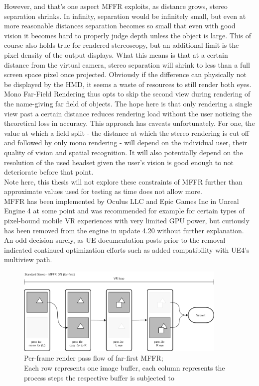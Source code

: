 However, and that's one aspect MFFR exploits, as distance grows, stereo separation shrinks. In infinity, separation would be infinitely small, but even at more reasonable distances separation becomes so small that even with good vision it becomes hard to properly judge depth unless the object is large. This of course also holds true for rendered stereoscopy, but an additional limit is the pixel density of the output displays. What this means is that at a certain distance from the virtual camera, stereo separation will shrink to less than a full screen space pixel once projected. Obviously if the difference can physically not be displayed by the HMD, it seems a waste of resources to still render both eyes. \\
Mono Far-Field Rendering thus opts to skip the second view during rendering of the name-giving far field of objects. The hope here is that only rendering a single view past a certain distance reduces rendering load without the user noticing the theoretical loss in accuracy. 
This approach has caveats unfortunately. For one, the value at which a field split - the distance at which the stereo rendering is cut off and followed by only mono rendering - will depend on the individual user, their quality of vision and spatial recognition. It will also potentially depend on the resolution of the used headset given the user's vision is good enough to not deteriorate before that point. \\
Note here, this thesis will not explore these constraints of MFFR further than approximate values used for testing as time does not allow more. \\
MFFR has been implemented by Oculus LLC and Epic Games Inc in Unreal Engine 4 at some point and was recommended for example for certain types of pixel-bound mobile VR experiences with very limited GPU power, but curiously has been removed from the engine in update 4.20 without further explanation. An odd decision surely, as UE documentation posts prior to the removal indicated continued optimization efforts such as added compatibility with UE4's multiview path\cite{EpicGamesInc..2016}. 

\begin{figure}[htb]
  \centering
  \includegraphics[width=0.9\textwidth]{pictures/MFFR_farfirst}
  \caption{Per-frame render pass flow of far-first MFFR; \\
  Each row represents one image buffer, each column represents the process steps the respective buffer is subjected to} \label{fig:flowchart_mffr_FarFirst}
\end{figure}

